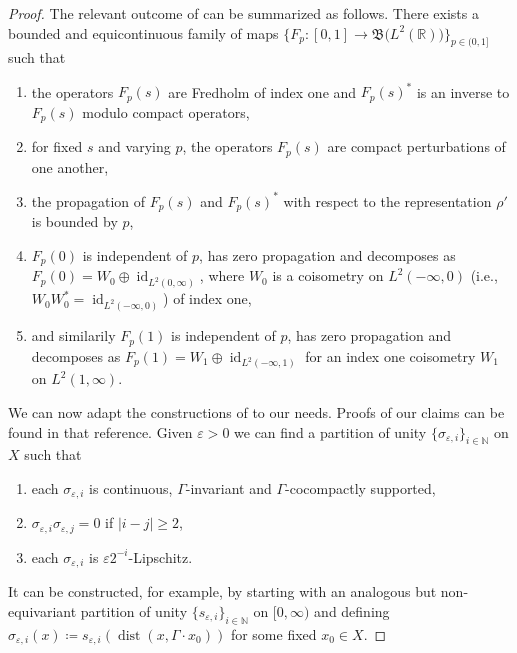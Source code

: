 \documentclass[pdftex]{sigma}
\numberwithin{equation}{section}
\theoremstyle{definition}
\newcommand{\N}{\mathbb{N}}
\newcommand{\R}{\mathbb{R}}
\DeclareMathOperator{\id}{id}
\DeclareMathOperator{\dist}{dist}
\newcommand{\Lin}{{\mathfrak{B}}}
\begin{document}
\begin{proof}
The relevant outcome of \cite[Sections 6]{HigsonRoeHomotopy} can be summarized as follows. There exists a bounded and equicontinuous family of maps $\big\{F_p\colon[0,1]\to\Lin\big(L^2(\R)\big)\big\}_{p\in(0,1]}$ such that
\begin{enumerate}\itemsep=0pt
\item[$\bullet$] the operators $F_p(s)$ are Fredholm of index one and $F_p(s)^*$ is an inverse to $F_p(s)$ modulo compact operators,
\item[$\bullet$] for fixed $s$ and varying $p$, the operators $F_p(s)$ are compact perturbations of one another,
\item[$\bullet$] the propagation of $F_p(s)$ and $F_p(s)^*$ with respect to the representation $\rho'$ is bounded by $p$,
\item[$\bullet$] $F_p(0)$ is independent of $p$, has zero propagation and decomposes as $F_p(0)=W_0\oplus\id_{L^2(0,\infty)}$, where $W_0$ is a coisometry on $L^2(-\infty,0)$ (i.e., $W_0W_0^*=\id_{L^2(-\infty,0)}$) of index one,
\item[$\bullet$] and similarily $F_p(1)$ is independent of $p$, has zero propagation and decomposes as $F_p(1)=W_1\oplus\id_{L^2(-\infty,1)}$ for an index one coisometry $W_1$ on $L^2(1,\infty)$.
\end{enumerate}

We can now adapt the constructions of \cite[Sections 5]{HigsonRoeHomotopy} to our needs. Proofs of our claims can be found in that reference.
Given $\varepsilon>0$ we can find a partition of unity $\{\sigma_{\varepsilon,i}\}_{i\in\N}$ on $X$ such that
\begin{enumerate}\itemsep=0pt
\item[$\bullet$] each $\sigma_{\varepsilon,i}$ is continuous, $\Gamma$-invariant and $\Gamma$-cocompactly supported,
\item[$\bullet$] $\sigma_{\varepsilon,i}\sigma_{\varepsilon,j}=0$ if $|i-j|\geq 2$,
\item[$\bullet$] each $\sigma_{\varepsilon,i}$ is $\varepsilon 2^{-i}$-Lipschitz. \end{enumerate}
It can be constructed, for example, by starting with an analogous but non-equivariant partition of unity $\{s_{\varepsilon,i}\}_{i\in\N}$ on $[0,\infty)$ and defining $\sigma_{\varepsilon,i}(x)\coloneqq s_{\varepsilon,i}(\dist(x,\Gamma\cdot x_0))$ for some fixed $x_0\in X$.


\end{proof}
\end{document}
